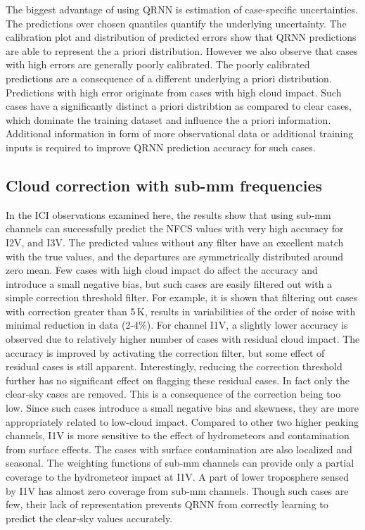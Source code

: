 \documentclass[amt, manuscript]{copernicus}
\begin{document}
The biggest advantage of using QRNN is estimation of case-specific uncertainties. The predictions over chosen quantiles quantify the underlying uncertainty. The calibration plot and distribution of predicted errors show that  QRNN predictions are able to represent the a priori distribution. However we also observe that cases with high errors are generally poorly calibrated. The poorly calibrated predictions are a consequence of a different underlying a priori distribution. Predictions with high error originate from cases with high cloud impact. Such cases have a significantly distinct a priori distribtion as compared to clear cases, which dominate the training dataset and influence the a priori information. Additional information in form of more observational data or additional training inputs is required to improve QRNN prediction accuracy for such cases.  


\subsection{Cloud correction with sub-mm frequencies }
%
In the ICI observations examined here, the results show that using sub-mm channels can successfully predict the NFCS values with very high accuracy for I2V, and I3V. The predicted values without any filter have an excellent match with the true values, and the departures are symmetrically distributed around zero mean. Few cases with high cloud impact do affect the accuracy and introduce a small negative bias, but such cases are easily filtered out with a simple correction threshold filter. For example, it is shown that filtering out cases with correction greater than 5\,K, results in variabilities of the order of noise with minimal reduction in data (2-4\%). For channel I1V, a slightly lower accuracy is observed due to relatively higher number of cases with residual cloud impact. The accuracy is improved by activating the correction filter, but some effect of residual cases is still apparent. Interestingly, reducing the correction threshold further has no significant effect on flagging these residual cases. In fact only the clear-sky cases are removed. This is a consequence of the correction being too low. Since such cases introduce a small negative bias and skewness, they are more appropriately related to low-cloud impact. Compared to other two higher peaking channels, I1V is more sensitive to the effect of hydrometeors  and contamination from surface effects. The cases with surface contamination are also localized and seasonal. The weighting functions of sub-mm channels can provide only a partial coverage to the hydrometeor impact at I1V. A part of lower troposphere sensed by I1V has almost zero coverage from sub-mm channels. Though such cases are few, their lack of representation prevents QRNN from correctly learning to predict the clear-sky values accurately.
\end{document}
